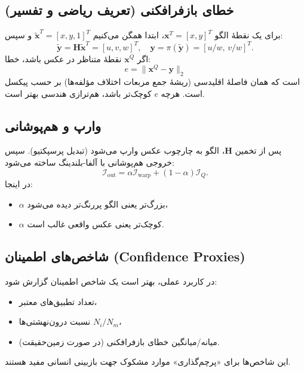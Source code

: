 \subsection{خطای بازفرافکنی (تعریف ریاضی و تفسیر)}
برای یک نقطهٔ الگو $\mathbf{x}^T=[x,y]^T$، ابتدا همگن می‌کنیم $\tilde{\mathbf{x}}^T=[x,y,1]^T$ و سپس:
\[
\tilde{\mathbf{y}} = \mathbf{H}\tilde{\mathbf{x}}^T = [u,v,w]^T,\quad
\mathbf{y} = \pi(\tilde{\mathbf{y}})=[u/w,\, v/w]^T.
\]
اگر $\mathbf{x}^Q$ نقطهٔ متناظر در عکس باشد، خطا:
\[
e = \|\mathbf{x}^Q - \mathbf{y}\|_2
\]
است که همان فاصلهٔ اقلیدسی (ریشهٔ جمع مربعات اختلاف مؤلفه‌ها) بر حسب پیکسل است. هرچه $e$ کوچک‌تر باشد، هم‌ترازی هندسی بهتر است.

\subsection{وارپ و هم‌پوشانی}
پس از تخمین $\mathbf{H}$، الگو به چارچوب عکس وارپ می‌شود (تبدیل پرسپکتیو). سپس خروجی هم‌پوشانی با آلفا-بلندینگ ساخته می‌شود:
\[
\mathcal{I}_{\text{out}} = \alpha \mathcal{I}_{\text{warp}} + (1-\alpha)\mathcal{I}_Q.
\]
در اینجا:
\begin{itemize}
  \item $\alpha$ بزرگ‌تر یعنی الگو پررنگ‌تر دیده می‌شود،
  \item $\alpha$ کوچک‌تر یعنی عکس واقعی غالب است.
\end{itemize}

\subsection{شاخص‌های اطمینان (Confidence Proxies)}
در کاربرد عملی، بهتر است یک شاخص اطمینان گزارش شود:
\begin{itemize}
  \item تعداد تطبیق‌های معتبر،
  \item نسبت درون‌نهشتی‌ها $N_i/N_m$،
  \item (در صورت زمین‌حقیقت) میانه/میانگین خطای بازفرافکنی.
\end{itemize}
این شاخص‌ها برای «پرچم‌گذاری» موارد مشکوک جهت بازبینی انسانی مفید هستند.
